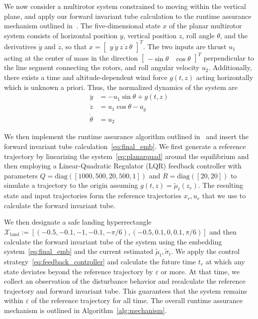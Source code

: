 \documentclass[preprint,12pt]{elsarticle}
\begin{document}
We now consider a multirotor system constrained to moving within the vertical plane, and apply our forward invariant tube calculation to the runtime assurance mechanism outlined in~\cite{caoICRARTA}. The five-dimensional state $x$ of the planar multirotor system consists of horizontal position $y$, vertical position $z$, roll angle $\theta$, and the derivatives $\dot{y}$ and $\dot{z}$, so that $x=\begin{bmatrix}y\ \dot{y}\ z\ \dot{z}\ \theta\end{bmatrix}^T$. The two inputs are thrust $u_1$  acting at the center of mass in the direction $\begin{bmatrix}-\sin\theta&\cos\theta\end{bmatrix}^T$ perpendicular to the line segment connecting the rotors, and roll angular velocity $u_2$. Additionally, there exists a time and altitude-dependent wind force $g(t, z)$ acting horizontally which is unknown a priori. Thus, the normalized dynamics of the system are
\begin{equation}
  \label{eq:planarquad}
  \begin{split}
  \ddot{y}&=-u_1\sin \theta+g(t, z)\\
  \ddot{z}&=u_1\cos \theta-a_g\\
  \dot{\theta}&=u_2
  \end{split}
\end{equation}

We then implement the runtime assurance algorithm outlined in~\cite{caoICRARTA} and insert the forward invariant tube calculation~\eqref{eq:final_emb}. We first generate a reference trajectory by linearizing the system~\eqref{eq:planarquad} around the equilibrium and then employing a Linear-Quadratic Regulator (LQR) feedback controller with parameters
$Q = \text{diag}([1000, 500, 20, 500, 1])$ and $R = \text{diag}([20, 20])$ to simulate a trajectory to the origin assuming $g(t, z) = \widetilde{\mu}_t(z_r)$. The resulting state and input trajectories form the reference trajectories $x_r, u_r$ that we use to calculate the forward invariant tube.

We then designate a safe landing hyperrectangle $\mathcal{X}_\text{land} := [(-0.5, -0.1, -1, -0.1, -\pi/6), (-0.5, 0.1, 0, 0.1, \pi/6)]$ and then calculate the forward invariant tube of the system using the embedding system~\eqref{eq:final_emb} and the current estimated $\widetilde{\mu}_t, \widetilde{\sigma}_t$. We apply the control strategy~\eqref{eq:feedback_controller} and calculate the future time $t_r$ at which any state deviates beyond the reference trajectory by $\varepsilon$ or more. At that time, we collect an observation of the disturbance behavior and recalculate the reference trajectory and forward invariant tube. This guarantees that the system remains within $\varepsilon$ of the reference trajectory for all time. The overall runtime assurance mechanism is outlined in Algorithm~\ref{alg:mechanism}.
\end{document}
